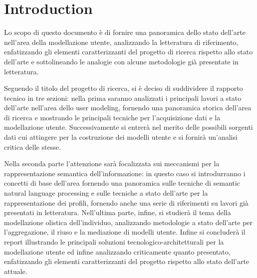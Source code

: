 
\cleardoublepage
\chapter*{Introduction}

Lo scopo di questo documento è di fornire una panoramica dello stato dell’arte nell’area della modellazione utente, analizzando la letteratura di riferimento, enfatizzando gli elementi caratterizzanti del progetto di ricerca rispetto allo stato dell’arte e sottolineando le analogie con alcune metodologie già presentate in letteratura.

Seguendo il titolo del progetto di ricerca, si è deciso di suddividere il rapporto tecnico in tre sezioni: nella prima saranno analizzati i principali lavori a stato dell’arte nell’area dello user modeling, fornendo una panoramica storica dell’area di ricerca e mostrando le principali tecniche per l’acquisizione dati e la modellazione utente. Successivamente si entrerà nel merito delle possibili sorgenti dati cui attingere per la costruzione dei modelli utente e si fornirà un’analisi critica delle stesse.

Nella seconda parte l’attenzione sarà focalizzata sui meccanismi per la rappresentazione semantica dell’informazione: in questo caso si introdurranno i concetti di base dell’area fornendo una panoramica sulle tecniche di semantic natural language processing e sulle tecniche a stato dell’arte per la rappresentazione dei profili, fornendo anche una serie di riferimenti su lavori già presentati in letteratura. Nell’ultima parte, infine, si studierà il tema della modellazione olistica dell’individuo, analizzando metodologie a stato dell’arte per l’aggregazione, il riuso e la mediazione di modelli utente. Infine si concluderà il report illustrando le principali soluzioni tecnologico-architetturali per la modellazione utente ed infine analizzando criticamente quanto presentato, enfatizzando gli elementi caratterizzanti del progetto rispetto allo stato dell’arte attuale.

